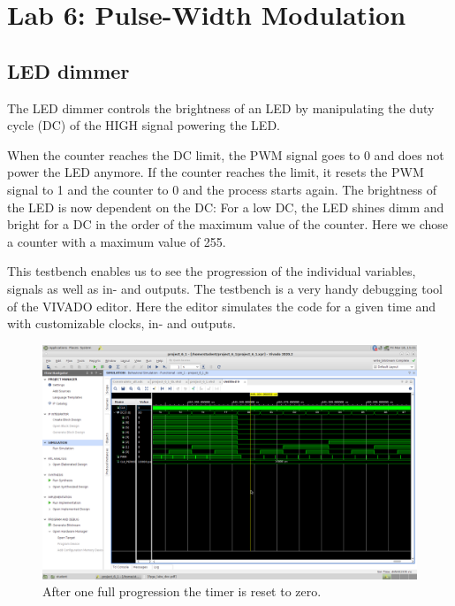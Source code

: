 \chapter{Lab 6: Pulse-Width Modulation} \label{day6}

\section{LED dimmer}

The LED dimmer controls the brightness of an LED by manipulating the duty cycle (DC) of the HIGH signal powering the LED. 



When the counter reaches the DC limit, the PWM signal goes to 0 and does not power the LED anymore. If the counter reaches the limit, it resets the PWM signal to 1 and the counter to 0 and the process starts again. The brightness of the LED is now dependent on the DC: For a low DC, the LED shines dimm and bright for a DC in the order of the maximum value of the counter. Here we chose a counter with a maximum value of 255.




This testbench enables us to see the progression of the individual variables, signals as well as in- and outputs. The testbench is a very handy debugging tool of the VIVADO editor. Here the editor simulates the code for a given time and with customizable clocks, in- and outputs. 

\begin{figure}[h]
	\centering
	\includegraphics[width=.8\linewidth]{./L6/E1/overflow_time.png}
	\caption{After one full progression the timer is reset to zero.} 
	\label{fig: overflow_time e_6_1 LED dimmer}
\end{figure}

